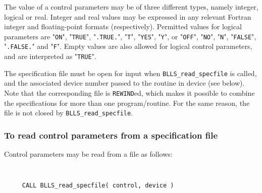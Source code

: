 \documentclass{galahad}
\newcommand{\packagename}{BLLS}
\begin{document}
The value of a control parameters may be of three different types, namely
integer, logical or real.
Integer and real values may be expressed in any relevant Fortran integer and
floating-point formats (respectively). Permitted values for logical
parameters are "{\tt ON}", "{\tt TRUE}", "{\tt .TRUE.}", "{\tt T}",
"{\tt YES}", "{\tt Y}", or "{\tt OFF}", "{\tt NO}",
"{\tt N}", "{\tt FALSE}", "{\tt .FALSE.}" and "{\tt F}".
Empty values are also allowed for
logical control parameters, and are interpreted as "{\tt TRUE}".

The specification file must be open for
input when {\tt \packagename\_read\_specfile}
is called, and the associated device number
passed to the routine in device (see below).
Note that the corresponding
file is {\tt REWIND}ed, which makes it possible to combine the specifications
for more than one program/routine.  For the same reason, the file is not
closed by {\tt \packagename\_read\_specfile}.

\subsubsection{To read control parameters from a specification file}
\label{readspec}

Control parameters may be read from a file as follows:
\hskip0.5in

\def\baselinestretch{0.8}
{\tt
\begin{verbatim}
     CALL BLLS_read_specfile( control, device )
\end{verbatim}
}
\def\baselinestretch{1.0}
\end{document}
